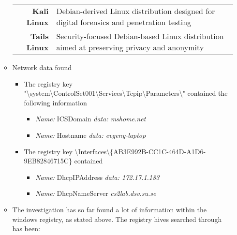 \begin{enumerate}
\begin{itemize}
	\begin{tabular}{|r|l|}
		\hline
		\textbf{Kali Linux} & Debian-derived Linux distribution designed for digital forensics and penetration testing \\
		\textbf{Tails Linux} & Security-focused Debian-based Linux distribution aimed at preserving privacy and anonymity \\
		\hline
	\end{tabular}

	\newpage
	\item Network data found
	
	\begin{itemize}
	
	\item The registry key "\textbackslash system\textbackslash ControlSet001\textbackslash Services\textbackslash Tcpip\textbackslash Parameters\textbackslash" contained the following information
	\begin{itemize}
		\item \textit{Name:} ICSDomain  \textit{data: mshome.net}
		\item \textit{Name:} Hostname  \textit{data: evgeny-laptop}
		
	\end{itemize}
	
	\item The registry key \textbackslash Interfaces\textbackslash \{AB3E992B-CC1C-464D-A1D6-9EB82846715C\} contained
	
	\begin{itemize}
		\item \textit{Name:} DhcpIPAddress  \textit{data: 172.17.1.183}
		\item \textit{Name:} DhcpNameServer  \textit{cs2lab.dsv.su.se}
	\end{itemize}
	
\end{itemize}	
	
	\newpage
	\item The investigation has so far found a lot of information within the windows registry, as stated above. The registry hives searched through has been:
	

\end{itemize}
\end{enumerate}
